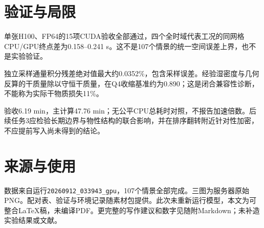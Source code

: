 \documentclass[UTF8,fontset=fandol,11pt,a4paper]{ctexart}
\begin{document}
\section{验证与局限}
单张H100、FP64的15项CUDA验收全部通过，四个全时域代表工况的同网格CPU/GPU终点差为0.158--0.241 s。这不是107个情景的统一空间误差上界，也不是实验验证。

独立采样通量积分残差绝对值最大约0.0352\%，包含采样误差。经验湿密度与几何反算的干质量除以守恒干质量，在Q4收缩基准约为0.890；这是闭合兼容性诊断，不能称为实际干物质损失11\%。

验收6.19 min，主计算47.76 min；无公平CPU总耗时对照，不报告加速倍数。后续任务3应检验长期边界与物性结构的联合影响，并在排序翻转附近针对性加密，不应提前写入尚未得到的结论。
\appendix
\section{来源与使用}
数据来自运行\texttt{20260912\_033943\_gpu}，107个情景全部完成。三图为服务器原始PNG。配对表、验证与环境记录随素材包提供。此次未重新运行模型，本文为可整合LaTeX稿，未编译PDF。更完整的写作建议和数字见随附Markdown；未补造实验结果或文献。
\end{document}
